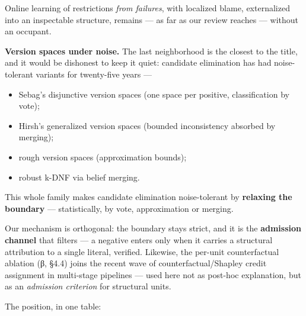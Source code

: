 \documentclass[11pt]{article}
\begin{document}
Online learning of restrictions \emph{from failures}, with localized blame, externalized into an inspectable structure, remains — as far as our review reaches — without an occupant.

\textbf{Version spaces under noise.} The last neighborhood is the closest to the title, and it would be dishonest to keep it quiet: candidate elimination has had noise-tolerant variants for twenty-five years —

\begin{itemize}
\item Sebag's disjunctive version spaces (one space per positive, classification by vote);
\item Hirsh's generalized version spaces (bounded inconsistency absorbed by merging);
\item rough version spaces (approximation bounds);
\item robust k-DNF via belief merging.
\end{itemize}

This whole family makes candidate elimination noise-tolerant by \textbf{relaxing the boundary} — statistically, by vote, approximation or merging.

Our mechanism is orthogonal: the boundary stays strict, and it is the \textbf{admission channel} that filters — a negative enters only when it carries a structural attribution to a single literal, verified. Likewise, the per-unit counterfactual ablation (β, §4.4) joins the recent wave of counterfactual/Shapley credit assignment in multi-stage pipelines — used here not as post-hoc explanation, but as an \emph{admission criterion} for structural units.

The position, in one table:
\end{document}
